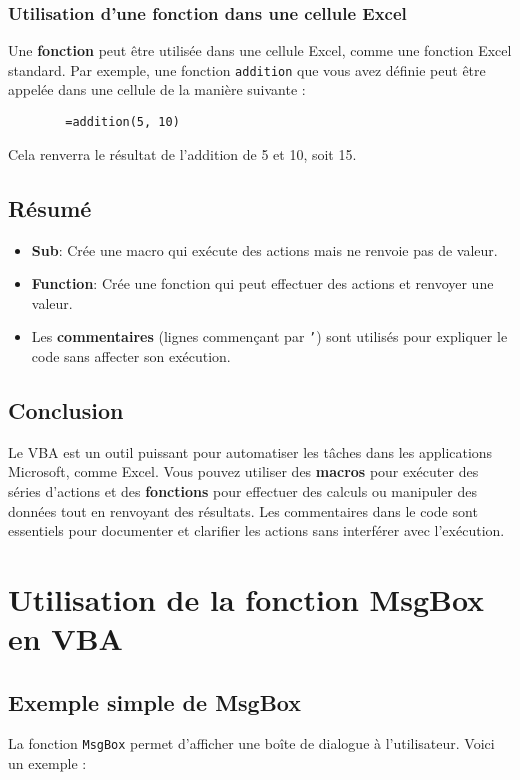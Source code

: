 \documentclass[a4paper,12pt]{report}
\begin{document}
	\subsection{Utilisation d'une fonction dans une cellule Excel}
	Une \textbf{fonction} peut être utilisée dans une cellule Excel, comme une fonction Excel standard. Par exemple, une fonction \texttt{addition} que vous avez définie peut être appelée dans une cellule de la manière suivante :
	
	\begin{verbatim}
		=addition(5, 10)
	\end{verbatim}
	
	Cela renverra le résultat de l'addition de 5 et 10, soit 15.
	
	\section{Résumé}
	\begin{itemize}
		\item \textbf{Sub}: Crée une macro qui exécute des actions mais ne renvoie pas de valeur.
		\item \textbf{Function}: Crée une fonction qui peut effectuer des actions et renvoyer une valeur.
		\item Les \textbf{commentaires} (lignes commençant par \texttt{'}) sont utilisés pour expliquer le code sans affecter son exécution.
	\end{itemize}
	
	\section{Conclusion}
	Le VBA est un outil puissant pour automatiser les tâches dans les applications Microsoft, comme Excel. Vous pouvez utiliser des \textbf{macros} pour exécuter des séries d'actions et des \textbf{fonctions} pour effectuer des calculs ou manipuler des données tout en renvoyant des résultats. Les commentaires dans le code sont essentiels pour documenter et clarifier les actions sans interférer avec l'exécution.
	
\chapter{Utilisation de la fonction MsgBox en VBA}

\section{Exemple simple de MsgBox}
La fonction \texttt{MsgBox} permet d'afficher une boîte de dialogue à l'utilisateur. Voici un exemple :
\end{document}
